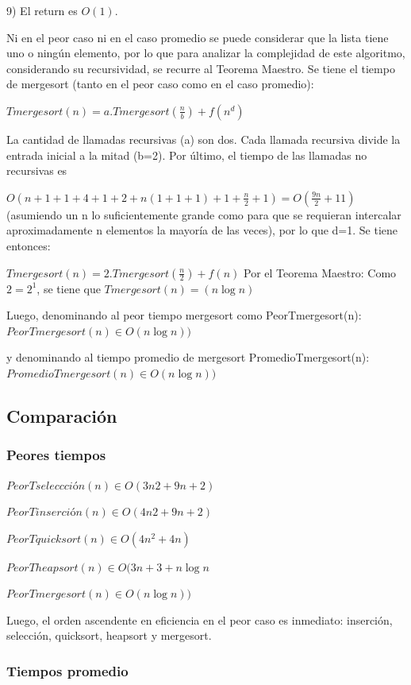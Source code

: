 \documentclass[article,a4paper]{article}
\begin{document}
9) El return es $O(1)$.

Ni en el peor caso ni en el caso promedio se puede considerar que la lista tiene uno o ningún elemento, por lo que para analizar la complejidad de este algoritmo, considerando su recursividad,  se recurre al Teorema Maestro. Se tiene el tiempo de mergesort (tanto en el peor caso como en el caso promedio):

$Tmergesort(n) = a.Tmergesort(\frac{n}{b}) + f(n^d)$

La cantidad de llamadas recursivas (a) son dos. Cada llamada recursiva divide la entrada inicial a la mitad (b=2). Por último, el tiempo de las llamadas no recursivas es 

$O(n +1 + 1 +4 + 1+ 2 +n(1 + 1 +1) + 1 + \frac{n}{2} +1 ) =O( \frac{9n}{2} +11 )$
(asumiendo un n lo suficientemente grande como para que se requieran intercalar aproximadamente n elementos la mayoría de las veces), por lo que d=1. Se tiene entonces:

$Tmergesort(n) = 2.Tmergesort(\frac{n}{2}) + f(n)$
Por el Teorema Maestro: Como $2 = 2^1$, se tiene que $Tmergesort(n) =(n \log n)$

Luego, denominando al peor tiempo mergesort como PeorTmergesort(n): $PeorTmergesort(n) \in O(n \log n))$

y denominando al tiempo promedio de mergesort PromedioTmergesort(n): $PromedioTmergesort(n) \in O(n \log n))$

\subsection{Comparación}

\subsubsection{Peores tiempos}

$PeorTseleccción(n) \in O( 3n2 + 9n + 2)$ 

$PeorTinserción(n) \in O(4n2 + 9n + 2)$

$PeorTquicksort(n) \in O(4n^2 + 4n)$

$PeorTheapsort(n)  \in O(3n + 3 +n \log n$

$PeorTmergesort(n) \in O(n \log n))$

Luego, el orden ascendente en eficiencia en el peor caso es inmediato:
inserción, selección, quicksort, heapsort y mergesort.

\subsubsection{Tiempos promedio}
\end{document}
